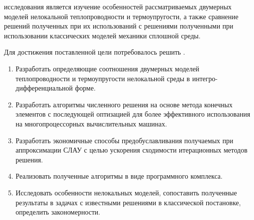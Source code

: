 

{\aim}
исследования является изучение особенностей рассматриваемых двумерных моделей нелокальной теплопроводности и термоупругости, а также сравнение решений полученных при их использований с решениями полученными при использовании классических моделей механики сплошной среды.

Для достижения поставленной цели потребовалось решить {\tasks}.
\begin{enumerate}[beginpenalty=10000] %
  \item Разработать определяющие соотношения двумерных моделей теплопроводности и термоупругости нелокальной среды в интегро-дифференциальной форме.
  \item Разработать алгоритмы численного решения на основе метода конечных элементов с последующей оптизацией для более эффективного использования на многопроцессорных вычислительных машинах.
  \item Разработать экономичные способы предобуславливания получаемых при аппроксимации СЛАУ с целью ускорения сходимости итерационных методов решения.
  \item Реализовать полученные алгоритмы в виде программного комплекса.
  \item Исследовать особенности нелокальных моделей, сопоставить полученные результаты в задачах с известными решениями в классической постановке, определить закономерности.
\end{enumerate}


